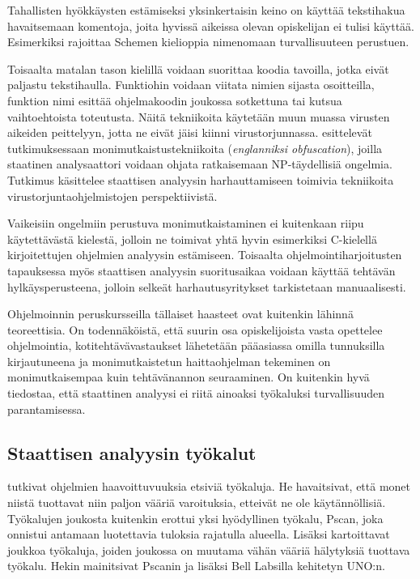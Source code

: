 Tahallisten hyökkäysten estämiseksi yksinkertaisin keino on käyttää
tekstihakua havaitsemaan komentoja, joita hyvissä aikeissa olevan opiskelijan
ei tulisi käyttää. Esimerkiksi {\scmrobo} rajoittaa Schemen kielioppia
nimenomaan turvallisuuteen perustuen.

Toisaalta matalan tason kielillä voidaan suorittaa koodia tavoilla, jotka
eivät paljastu tekstihaulla. Funktiohin voidaan viitata nimien sijasta
osoitteilla, funktion nimi esittää ohjelmakoodin joukossa sotkettuna
tai kutsua vaihtoehtoista toteutusta. Näitä tekniikoita käytetään muun
muassa virusten aikeiden peittelyyn, jotta ne eivät jäisi kiinni
virustorjunnassa. \citet{moser2007limits} esittelevät tutkimuksessaan
monimutkaistustekniikoita (\emph{englanniksi obfuscation}), joilla staatinen
analysaattori voidaan ohjata ratkaisemaan NP-täydellisiä ongelmia. Tutkimus
käsittelee staattisen analyysin harhauttamiseen toimivia tekniikoita
virustorjuntaohjelmistojen perspektiivistä.

Vaikeisiin ongelmiin perustuva monimutkaistaminen ei kuitenkaan riipu
käytettävästä kielestä, jolloin ne toimivat yhtä hyvin esimerkiksi 
C-kielellä kirjoitettujen ohjelmien analyysin estämiseen. Toisaalta 
ohjelmointiharjoitusten tapauksessa myös staattisen analyysin suoritusaikaa
voidaan käyttää tehtävän hylkäysperusteena, jolloin selkeät harhautusyritykset
tarkistetaan manuaalisesti.

Ohjelmoinnin peruskursseilla tällaiset haasteet ovat kuitenkin lähinnä
teoreettisia. On todennäköistä, että suurin osa opiskelijoista vasta opettelee
ohjelmointia, kotitehtävävastaukset lähetetään pääasiassa omilla tunnuksilla
kirjautuneena ja monimutkaistetun haittaohjelman tekeminen on monimutkaisempaa
kuin tehtävänannon seuraaminen. On kuitenkin hyvä tiedostaa, että staattinen
analyysi ei riitä ainoaksi työkaluksi turvallisuuden parantamisessa.

\subsection{Staattisen analyysin työkalut}

\citet{heffley2004can} tutkivat ohjelmien haavoittuvuuksia etsiviä työkaluja.
He havaitsivat, että monet niistä tuottavat niin paljon vääriä varoituksia,
etteivät ne ole käytännöllisiä. Työkalujen joukosta kuitenkin erottui yksi
hyödyllinen työkalu, Pscan, joka onnistui antamaan luotettavia tuloksia
rajatulla alueella. Lisäksi \citet{tevis2004methods} kartoittavat joukkoa
työkaluja, joiden joukossa on muutama vähän vääriä hälytyksiä tuottava työkalu.
Hekin mainitsivat Pscanin ja lisäksi Bell Labsilla kehitetyn UNO:n.

